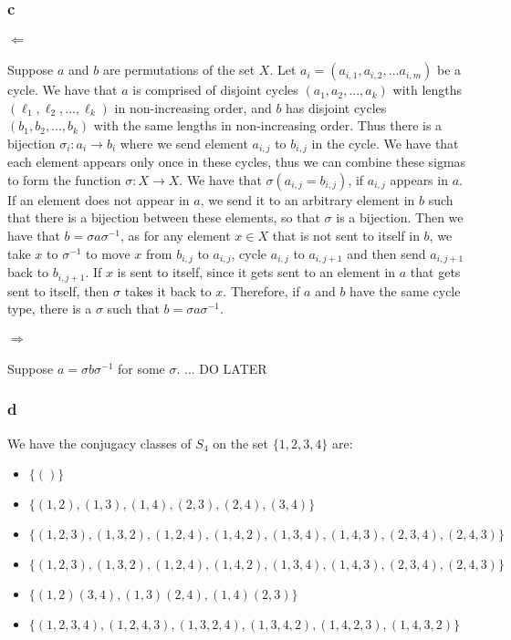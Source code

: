 \documentclass[]{article}
\begin{document}
\subsubsection*{c}
\paragraph{$\Leftarrow$}
Suppose $a$ and $b$ are permutations of the set $X$. Let $a_i = (a_{i, 1}, a_{i, 2}, ...a_{i, m})$ be a cycle. We have that $a$ is comprised of disjoint cycles $(a_1, a_2, ..., a_k)$ with lengths $(\ell_1, \ell_2, ..., \ell_k)$ in non-increasing order, and $b$ has disjoint cycles $(b_1, b_2, ..., b_k)$ with the same lengths in non-increasing order. Thus there is a bijection $\sigma_i : a_i \rightarrow b_i$ where we send element $a_{i, j}$ to $b_{i, j}$ in the cycle.  We have that each element appears only once in these cycles, thus we can combine these sigmas to form the function $\sigma: X \rightarrow X$. We have that $\sigma(a_{i, j} = b_{i,j})$, if $a_{i,j}$ appears in $a$. If an element does not appear in $a$, we send it to an arbitrary element in $b$ such that there is a bijection between these elements, so that $\sigma$ is a bijection. Then we have that $b = \sigma a \sigma^{-1}$, as for any element $x \in X$ that is not sent to itself in $b$, we take $x$ to $\sigma^{-1}$ to move $x$ from $b_{i,j}$ to $a_{i,j}$, cycle $a_{i,j}$ to $a_{i, j+1}$ and then send $a_{i, j+1}$ back to $b_{i, j+1}$. If $x$ is sent to itself, since it gets sent to an element in $a$ that gets sent to itself, then $\sigma$ takes it back to $x$. Therefore, if $a$ and $b$ have the same cycle type, there is a $\sigma$ such that $b = \sigma a \sigma^{-1}$. 
\paragraph{$\Rightarrow$}
Suppose $a = \sigma b \sigma^{-1}$ for some $\sigma$. ... DO LATER

\subsubsection*{d}
We have the conjugacy classes of $S_4$ on the set $\lbrace 1, 2, 3, 4 \rbrace$ are: 
\begin{itemize}
	\item $\lbrace () \rbrace$
	\item $\lbrace (1, 2), (1, 3), (1, 4), (2, 3), (2, 4), (3, 4) \rbrace$
	\item $\lbrace (1, 2, 3) , (1,3, 2), (1,2, 4), (1, 4, 2), (1, 3, 4), (1, 4, 3), (2, 3, 4), (2, 4, 3) \rbrace$
	\item $\lbrace (1, 2, 3) , (1,3, 2), (1,2, 4), (1, 4, 2), (1, 3, 4), (1, 4, 3), (2, 3, 4), (2, 4, 3) \rbrace$
	\item $\lbrace (1,2)(3, 4), (1, 3)(2, 4), (1,4)(2,3) \rbrace$
	\item $\lbrace(1, 2, 3, 4), (1, 2, 4, 3), (1, 3, 2, 4), (1, 3, 4, 2), (1, 4, 2, 3), (1, 4, 3, 2) \rbrace$
\end{itemize}
\end{document}
